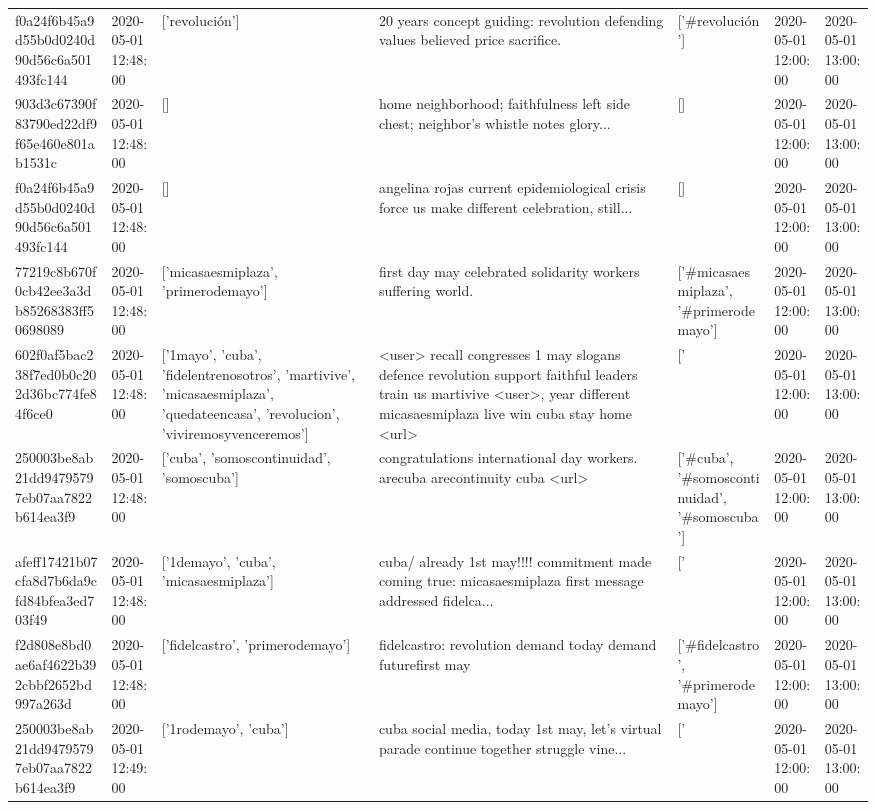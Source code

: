 \begin{tabular}{lllllll}
f0a24f6b45a9d55b0d0240d90d56c6a501493fc144 & 2020-05-01 12:48:00 & ['revolución'] & 20 years concept guiding: revolution defending values believed price sacrifice. & ['#revolución'] & 2020-05-01 12:00:00 & 2020-05-01 13:00:00 \\
903d3c67390f83790ed22df9f65e460e801ab1531c & 2020-05-01 12:48:00 & [] & home neighborhood; faithfulness left side chest; neighbor's whistle notes glory... & [] & 2020-05-01 12:00:00 & 2020-05-01 13:00:00 \\
f0a24f6b45a9d55b0d0240d90d56c6a501493fc144 & 2020-05-01 12:48:00 & [] & angelina rojas current epidemiological crisis force us make different celebration, still... & [] & 2020-05-01 12:00:00 & 2020-05-01 13:00:00 \\
77219c8b670f0cb42ee3a3db85268383ff50698089 & 2020-05-01 12:48:00 & ['micasaesmiplaza', 'primerodemayo'] & first day may celebrated solidarity workers suffering world. & ['#micasaesmiplaza', '#primerodemayo'] & 2020-05-01 12:00:00 & 2020-05-01 13:00:00 \\
602f0af5bac238f7ed0b0c202d36bc774fe84f6ce0 & 2020-05-01 12:48:00 & ['1mayo', 'cuba', 'fidelentrenosotros', 'martivive', 'micasaesmiplaza', 'quedateencasa', 'revolucion', 'viviremosyvenceremos'] & <user> recall congresses 1 may slogans defence revolution support faithful leaders train us martivive <user>, year different micasaesmiplaza live win cuba stay home <url> & ['#1mayo', '#cuba', '#micasaesmiplaza', '#quedateencasa', '#revolucion', '#viviremosyvenceremos'] & 2020-05-01 12:00:00 & 2020-05-01 13:00:00 \\
250003be8ab21dd94795797eb07aa7822b614ea3f9 & 2020-05-01 12:48:00 & ['cuba', 'somoscontinuidad', 'somoscuba'] & congratulations international day workers. arecuba arecontinuity cuba <url> & ['#cuba', '#somoscontinuidad', '#somoscuba'] & 2020-05-01 12:00:00 & 2020-05-01 13:00:00 \\
afeff17421b07cfa8d7b6da9cfd84bfea3ed703f49 & 2020-05-01 12:48:00 & ['1demayo', 'cuba', 'micasaesmiplaza'] & cuba/ already 1st may!!!! commitment made coming true: micasaesmiplaza first message addressed fidelca... & ['#1demayo', '#cuba', '#micasaesmiplaza'] & 2020-05-01 12:00:00 & 2020-05-01 13:00:00 \\
f2d808e8bd0ae6af4622b392cbbf2652bd997a263d & 2020-05-01 12:48:00 & ['fidelcastro', 'primerodemayo'] & fidelcastro: revolution demand today demand futurefirst may & ['#fidelcastro', '#primerodemayo'] & 2020-05-01 12:00:00 & 2020-05-01 13:00:00 \\
250003be8ab21dd94795797eb07aa7822b614ea3f9 & 2020-05-01 12:49:00 & ['1rodemayo', 'cuba'] & cuba social media, today 1st may, let's virtual parade continue together struggle vine... & ['#1rodemayo', '#cuba'] & 2020-05-01 12:00:00 & 2020-05-01 13:00:00 \\

\end{tabular}
